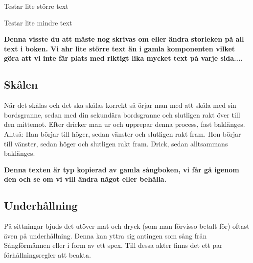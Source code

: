 {\fontsize{16}{18}\selectfont Testar lite större text}

{\fontsize{5}{7}\selectfont Testar lite mindre text}


\textbf{Denna visste du att måste nog skrivas om eller ändra storleken på all text i boken. Vi ahr lite större text än i gamla komponenten vilket göra att vi inte får plats med riktigt lika mycket text på varje sida....}


\newpage

\subsection*{Skålen}

När det skålas och det ska skålas korrekt så örjar man med att skåla med sin bordsgranne, sedan med din sekundära bordsgranne och slutligen rakt över till den mittemot. Efter dricker man ur och upprepar denna process, fast baklänges.
\\

Alltså:
Han börjar till höger,
sedan vänster och slutligen rakt fram.
Hon börjar till vänster,
sedan höger och slutligen rakt fram.
Drick, sedan alltsammans baklänges.

\textbf{Denna texten är typ kopierad av gamla sångboken, vi får gå igenom den och se om vi vill ändra något eller behålla.}


\newpage

\subsection*{Underhållning}
På sittningar bjuds det utöver mat och dryck (som man förvisso betalt för) oftast även på underhållning.
Denna kan yttra sig antingen som sång från Sångförmännen eller i form av ett spex.
Till dessa akter finns det ett par förhållningsregler att beakta.
\\

